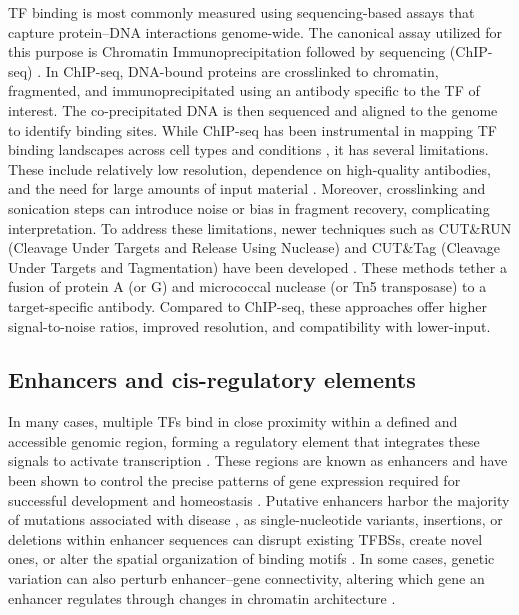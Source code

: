 \begin{dissertationintroduction}
TF binding is most commonly measured using sequencing-based assays that capture protein–DNA interactions genome-wide. The canonical assay utilized for this purpose is Chromatin Immunoprecipitation followed by sequencing (ChIP-seq) \cite{Johnson2007-pz}. In ChIP-seq, DNA-bound proteins are crosslinked to chromatin, fragmented, and immunoprecipitated using an antibody specific to the TF of interest. The co-precipitated DNA is then sequenced and aligned to the genome to identify binding sites. While ChIP-seq has been instrumental in mapping TF binding landscapes across cell types and conditions \cite{ENCODE_Project_Consortium2020-ns}, it has several limitations. These include relatively low resolution, dependence on high-quality antibodies, and the need for large amounts of input material \cite{Park2009-gj}. Moreover, crosslinking and sonication steps can introduce noise or bias in fragment recovery, complicating interpretation. To address these limitations, newer techniques such as CUT\&RUN (Cleavage Under Targets and Release Using Nuclease) and CUT\&Tag (Cleavage Under Targets and Tagmentation) have been developed \cite{Kaya-Okur2019-yz,Skene2017-vk}. These methods tether a fusion of protein A (or G) and micrococcal nuclease (or Tn5 transposase) to a target-specific antibody. Compared to ChIP-seq, these approaches offer higher signal-to-noise ratios, improved resolution, and compatibility with lower-input.

\subsection{Enhancers and cis-regulatory elements}

In many cases, multiple TFs bind in close proximity within a defined and accessible genomic region, forming a regulatory element that integrates these signals to activate transcription \cite{Spitz2012-la}. These regions are known as enhancers and have been shown to control the precise patterns of gene expression required for successful development and homeostasis \cite{Levine2010-ry}. Putative enhancers harbor the majority of mutations associated with disease \cite{Zaugg2022-ar,Maurano2012-cg,Tak2015-km}, as single-nucleotide variants, insertions, or deletions within enhancer sequences can disrupt existing TFBSs, create novel ones, or alter the spatial organization of binding motifs \cite{Lim2024-ph,Zaugg2022-ar,Jindal2023-fp}. In some cases, genetic variation can also perturb enhancer–gene connectivity, altering which gene an enhancer regulates through changes in chromatin architecture \cite{Mortenson2024-tn}.


\end{dissertationintroduction}
